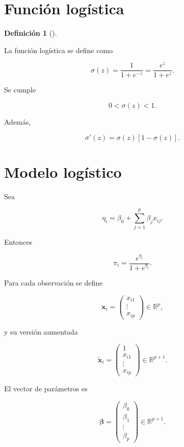 \documentclass[
  spanish,
  10.5pt,
  letterpaper,
  DIV=11,
  numbers=noendperiod,
  oneside,
  open=any]{scrreprt}
\theoremstyle{definition}
\newtheorem{definition}{Definición}[chapter]
\theoremstyle{definition}
\theoremstyle{plain}
\theoremstyle{remark}
\begin{document}
\section*{Función logística}\label{funciuxf3n-loguxedstica}


\begin{definition}[]\protect\hypertarget{def-funcion-logistica}{}\label{def-funcion-logistica}

La función logística se define como

\[
\sigma(z)
=
\frac{1}{1+e^{-z}}
=
\frac{e^z}{1+e^z}.
\]

\end{definition}

Se cumple

\[
0<\sigma(z)<1.
\]

Además,

\[
\sigma'(z)
=
\sigma(z)\left[1-\sigma(z)\right].
\]

\section*{Modelo logístico}\label{modelo-loguxedstico}


Sea

\[
\eta_i
=
\beta_0+
\sum_{j=1}^{p}\beta_j x_{ij}.
\]

Entonces

\[
\pi_i
=
\frac{e^{\eta_i}}{1+e^{\eta_i}}.
\]

Para cada observación se define

\[
\mathbf{x}_i
=
\begin{pmatrix}
x_{i1}\\
\vdots\\
x_{ip}
\end{pmatrix}
\in\mathbb{R}^{p},
\]

y su versión aumentada

\[
\widetilde{\mathbf{x}}_i
=
\begin{pmatrix}
1\\
x_{i1}\\
\vdots\\
x_{ip}
\end{pmatrix}
\in\mathbb{R}^{p+1}.
\]

El vector de parámetros es

\[
\boldsymbol{\beta}
=
\begin{pmatrix}
\beta_0\\
\beta_1\\
\vdots\\
\beta_p
\end{pmatrix}
\in\mathbb{R}^{p+1}.
\]
\end{document}
